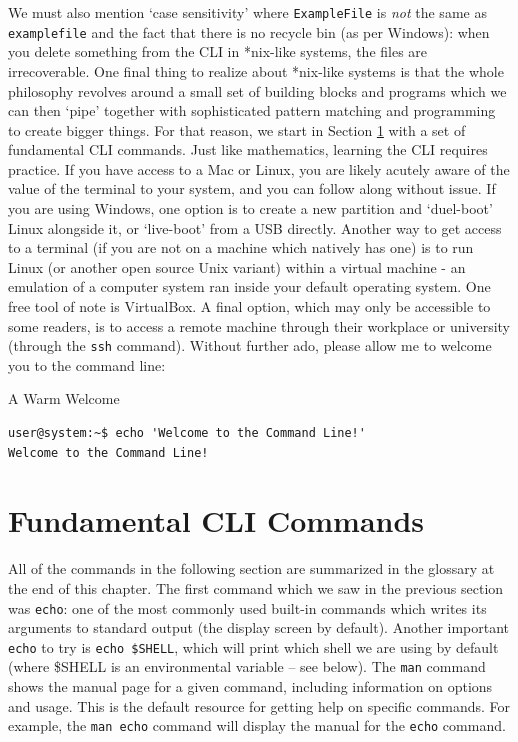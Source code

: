 \documentclass[11pt]{article}
\begin{document}
We must also mention `case sensitivity' where \texttt{ExampleFile} is \emph{not} the same as \texttt{examplefile} and the fact that there is no recycle bin (as per Windows): when you delete something from the CLI in *nix-like systems, the files are irrecoverable. One final thing to realize about *nix-like systems is that the whole philosophy revolves around a small set of building blocks and programs which we can then `pipe' together with sophisticated pattern matching and programming to create bigger things. For that reason, we start in Section \ref{fundamentalclicommands} with a set of fundamental CLI commands. Just like mathematics, learning the CLI requires practice. If you have access to a Mac or Linux, you are likely acutely aware of the value of the terminal to your system, and you can follow along without issue. If you are using Windows, one option is to create a new partition and `duel-boot' Linux alongside it, or `live-boot' from a USB directly. Another way to get access to a terminal (if you are not on a machine which natively has one) is to run Linux (or another open source Unix variant) within a virtual machine - an emulation of a computer system ran inside your default operating system. One free tool of note is VirtualBox. A final option, which may only be accessible to some readers, is to access a remote machine through their workplace or university (through the \texttt{ssh} command). Without further ado, please allow me to welcome you to the command line:\\

\begin{listing}[H]
\caption{A Warm Welcome}\vspace{-0.1in}
\begin{verbatim}
user@system:~$ echo 'Welcome to the Command Line!'
Welcome to the Command Line!
\end{verbatim}
\end{listing}

\noindent
\section{Fundamental CLI Commands}\label{fundamentalclicommands}

All of the commands in the following section are summarized in the glossary at the end of this chapter. The first command which we saw in the previous section was \texttt{echo}: one of the most commonly used built-in commands which writes its arguments to standard output (the display screen by default). Another important \texttt{echo} to try is \texttt{echo \$SHELL}, which will print which shell we are using by default (where \${SHELL} is an environmental variable -- see below). The \texttt{man} command shows the manual page for a given command, including information on options and usage. This is the default resource for getting help on specific commands. For example, the \texttt{man echo} command will display the manual for the \texttt{echo} command.\\
\end{document}
